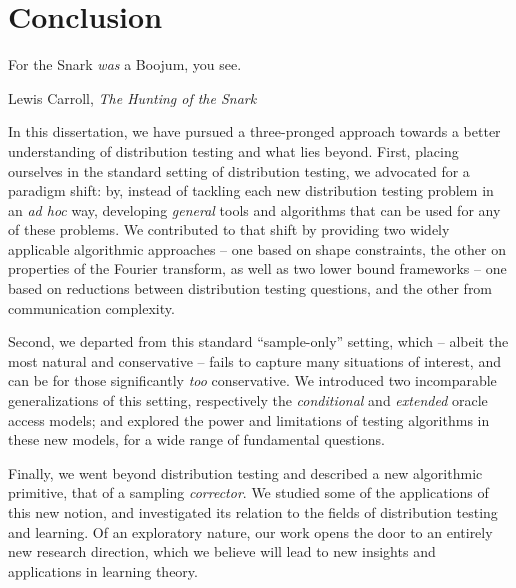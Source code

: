 \chapter*{Conclusion} %

\epigraph{For the Snark \emph{was} a Boojum, you see.}{Lewis Carroll, \textit{The Hunting of the Snark}}


In this dissertation, we have pursued a three-pronged approach towards a better understanding of distribution testing and what lies beyond. First, placing ourselves in the standard setting of distribution testing, we advocated for a paradigm shift: by, instead of tackling each new distribution testing problem in an \textit{ad hoc} way, developing \emph{general} tools and algorithms that can be used for any of these problems. We contributed to that shift by providing two widely applicable algorithmic approaches -- one based on shape constraints, the other on properties of the Fourier transform, as well as two lower bound frameworks -- one based on reductions between distribution testing questions, and the other from communication complexity. 

Second, we departed from this standard ``sample-only'' setting, which -- albeit the most natural and conservative -- fails  to capture many situations of interest, and can be for those significantly \emph{too} conservative. We introduced two incomparable generalizations of this setting, respectively the \emph{conditional} and \emph{extended} oracle access models; and explored the power and limitations of testing algorithms in these new models, for a wide range of fundamental questions.

Finally, we went beyond distribution testing and described a new algorithmic primitive, that of a sampling \emph{corrector}. We studied some of the applications of this new notion, and investigated its relation to the fields of distribution testing and learning. Of an exploratory nature, our work opens the door to an entirely new research direction, which we believe will lead to new insights and applications in learning theory.

